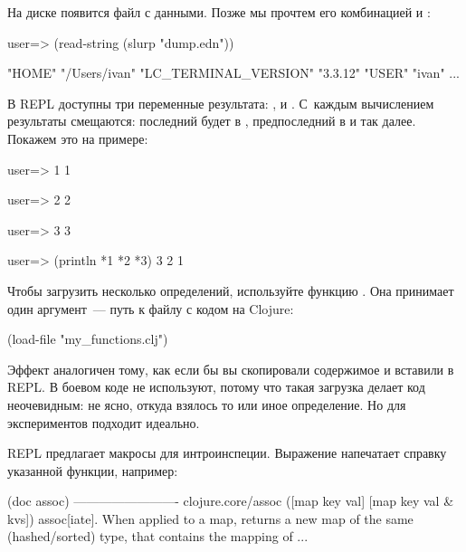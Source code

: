 
На диске появится файл  с данными. Позже мы прочтем его комбинацией  и :

\begin{english}
  \begin{clojure}
user=> (read-string (slurp "dump.edn"))

{"HOME" "/Users/ivan"
 "LC_TERMINAL_VERSION" "3.3.12"
 "USER" "ivan"
 ...}
  \end{clojure}
\end{english}

В REPL доступны три переменные результата: ,  и . С~каждым вычислением результаты смещаются: последний будет в , предпоследний в  и так далее. Покажем это на примере:

\begin{english}
  \begin{clojure}
user=> 1
1

user=> 2
2

user=> 3
3

user=> (println *1 *2 *3)
3 2 1
  \end{clojure}
\end{english}


Чтобы загрузить несколько определений, используйте функцию . Она принимает один аргумент~--- путь к файлу с кодом на Clojure:

\begin{english}
  \begin{clojure}
(load-file "my_functions.clj")
  \end{clojure}
\end{english}

Эффект аналогичен тому, как если бы вы скопировали содержимое и вставили в REPL. В боевом коде  не используют, потому что такая загрузка делает код неочевидным: не ясно, откуда взялось то или иное определение. Но для экспериментов  подходит идеально.

REPL предлагает макросы для интроинспеции. Выражение  напечатает справку указанной функции, например:

\begin{english}
  \begin{text}
(doc assoc)
-------------------------
clojure.core/assoc
([map key val] [map key val & kvs])
  assoc[iate]. When applied to a map, returns a new map
    of the same (hashed/sorted) type, that contains the
    mapping of ...
  \end{text}
\end{english}

